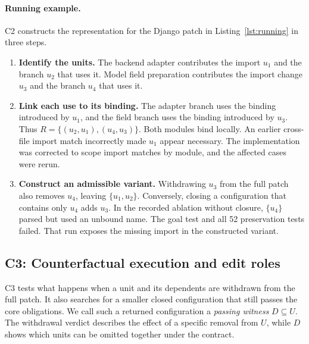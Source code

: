 \documentclass[a4paper,fleqn]{cas-sc}
\newcommand{\code}[1]{\texttt{\detokenize{#1}}}
\begin{document}
\paragraph{Running example.} C2 constructs the representation for the Django patch in Listing~\ref{lst:running} in three steps.
\begin{enumerate}
\item \textbf{Identify the units.} The backend adapter contributes the import $u_1$ and the branch $u_2$ that uses it. Model field preparation contributes the import change $u_3$ and the branch $u_4$ that uses it.
\item \textbf{Link each use to its binding.} The adapter branch uses the binding introduced by $u_1$, and the field branch uses the binding introduced by $u_3$. Thus $R=\{(u_2,u_1),(u_4,u_3)\}$. Both modules bind \code{LazyObject} locally. An earlier cross-file import match incorrectly made $u_1$ appear necessary. The implementation was corrected to scope import matches by module, and the affected cases were rerun.
\item \textbf{Construct an admissible variant.} Withdrawing $u_3$ from the full patch also removes $u_4$, leaving $\{u_1,u_2\}$. Conversely, closing a configuration that contains only $u_4$ adds $u_3$. In the recorded ablation without closure, $\{u_4\}$ parsed but used an unbound name. The goal test and all 52 preservation tests failed. That run exposes the missing import in the constructed variant.
\end{enumerate}

\subsection{C3: Counterfactual execution and edit roles}\label{sec:triage}

C3 tests what happens when a unit and its dependents are withdrawn from the full patch. It also searches for a smaller closed configuration that still passes the core obligations. We call such a returned configuration a \emph{passing witness} $D\subseteq U$. The withdrawal verdict describes the effect of a specific removal from $U$, while $D$ shows which units can be omitted together under the contract.
\end{document}
